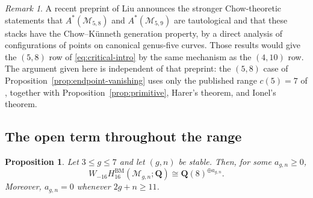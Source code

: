 \documentclass[12pt,reqno]{amsart}
\newcommand{\Q}{\mathbf{Q}}
\newcommand{\M}{\mathcal{M}}
\newcommand{\BM}{\mathrm{BM}}
\newtheorem{proposition}[theorem]{Proposition}
\theoremstyle{definition}
\theoremstyle{remark}
\newtheorem{remark}[theorem]{Remark}
\begin{document}
\begin{remark}\label{rem:liu}
A recent preprint of Liu \cite{Liu} announces the stronger Chow-theoretic
statements that $A^*(\M_{5,8})$ and $A^*(\M_{5,9})$ are tautological and
that these stacks have the Chow--K\"unneth generation property, by a direct
analysis of configurations of points on canonical genus-five curves.  Those
results would give the $(5,8)$ row of \eqref{eq:critical-intro} by the same
mechanism as the $(4,10)$ row.  The argument given here is independent of
that preprint: the $(5,8)$ case of Proposition~\ref{prop:endpoint-vanishing}
uses only the published range $c(5)=7$ of \cite{CLP,CanningLarsonStable},
together with Proposition~\ref{prop:primitive}, Harer's theorem, and Ionel's
theorem.
\end{remark}

\subsection{The open term throughout the range}

\begin{proposition}\label{prop:open-all}
Let $3\leq g\leq7$ and let $(g,n)$ be stable.  Then, for some
$a_{g,n}\geq0$,
\begin{equation}\label{eq:open-all}
 W_{-16}H_{16}^{\BM}(\M_{g,n};\Q)
 \cong\Q(8)^{\oplus a_{g,n}}.
\end{equation}
Moreover, $a_{g,n}=0$ whenever $2g+n\geq11$.
\end{proposition}
\end{document}
